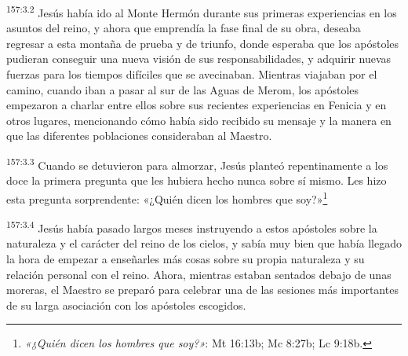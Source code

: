 \par
\textsuperscript{157:3.2} Jesús había ido al Monte Hermón durante sus primeras experiencias en los asuntos del reino, y ahora que emprendía la fase final de su obra, deseaba regresar a esta montaña de prueba y de triunfo, donde esperaba que los apóstoles pudieran conseguir una nueva visión de sus responsabilidades, y adquirir nuevas fuerzas para los tiempos difíciles que se avecinaban. Mientras viajaban por el camino, cuando iban a pasar al sur de las Aguas de Merom, los apóstoles empezaron a charlar entre ellos sobre sus recientes experiencias en Fenicia y en otros lugares, mencionando cómo había sido recibido su mensaje y la manera en que las diferentes poblaciones consideraban al Maestro.

\par
\textsuperscript{157:3.3} Cuando se detuvieron para almorzar, Jesús planteó repentinamente a los doce la primera pregunta que les hubiera hecho nunca sobre sí mismo. Les hizo esta pregunta sorprendente: «¿Quién dicen los hombres que soy?»\footnote{\textit{«¿Quién dicen los hombres que soy?»}: Mt 16:13b; Mc 8:27b; Lc 9:18b.}

\par
\textsuperscript{157:3.4} Jesús había pasado largos meses instruyendo a estos apóstoles sobre la naturaleza y el carácter del reino de los cielos, y sabía muy bien que había llegado la hora de empezar a enseñarles más cosas sobre su propia naturaleza y su relación personal con el reino. Ahora, mientras estaban sentados debajo de unas moreras, el Maestro se preparó para celebrar una de las sesiones más importantes de su larga asociación con los apóstoles escogidos.

